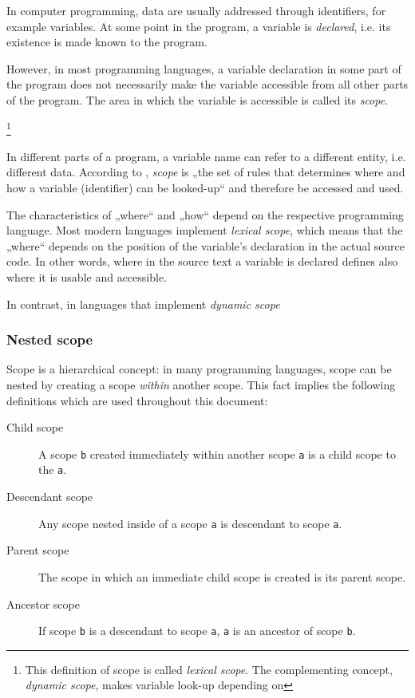 In computer programming, data are usually addressed through identifiers,
for example variables. At some point in the program, a variable is
\emph{declared}, i.e. its existence is made known to the program.

However, in most programming languages, a variable declaration in some
part of the program does not necessarily make the variable accessible
from all other parts of the program. The area in which the variable is
accessible is called its \emph{scope}.

\footnote{This definition of scope is called \emph{lexical scope}. The
  complementing concept, \emph{dynamic scope}, makes variable look-up
  depending on}

In different parts of a program, a variable name can refer to a
different entity, i.e. different data. According to ,
\emph{scope} is „the set of rules that determines where and how a
variable (identifier) can be looked-up“ and therefore be accessed and
used.

The characteristics of „where“ and „how“ depend on the respective
programming language. Most modern languages implement \emph{lexical
scope}, which means that the „where“ depends on the position of the
variable’s declaration in the actual source code. In other words, where
in the source text a variable is declared defines also where it is
usable and accessible.

In contrast, in languages that implement \emph{dynamic scope}

\subsubsection{Nested scope}\label{nested-scope}

Scope is a hierarchical concept: in many programming languages, scope
can be nested by creating a scope \emph{within} another scope. This fact
implies the following definitions which are used throughout this
document:

\begin{description}
\item[Child scope]
A scope \texttt{b} created immediately within another scope \texttt{a}
is a child scope to the \texttt{a}.
\item[Descendant scope]
Any scope nested inside of a scope \texttt{a} is descendant to scope
\texttt{a}.
\item[Parent scope]
The scope in which an immediate child scope is created is its parent
scope.
\item[Ancestor scope]
If scope \texttt{b} is a descendant to scope \texttt{a}, \texttt{a} is
an ancestor of scope \texttt{b}.
\end{description}

